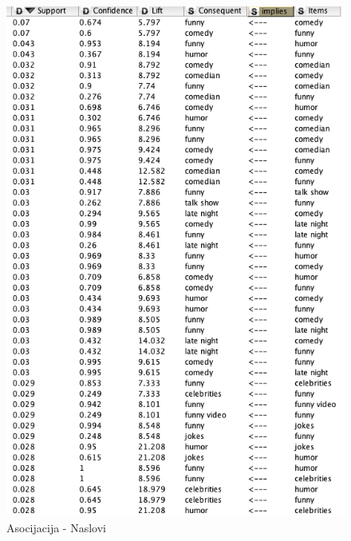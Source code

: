\documentclass[a4paper]{article}
\theoremstyle{definition}
\begin{document}
\begin{figure}[h!]
\begin{center}
    \includegraphics[width=1\textwidth]{association.png}
    \caption{Asocijacija - Naslovi}
    \label{fig:asoc1}
\end{center}
\end{figure}
\end{document}
